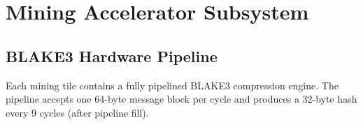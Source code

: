 \documentclass[11pt,a4paper]{article}
\begin{document}
\section{Mining Accelerator Subsystem}
\label{sec:mining}

\subsection{BLAKE3 Hardware Pipeline}

Each mining tile contains a fully pipelined BLAKE3 compression engine. The pipeline accepts one 64-byte message block per cycle and produces a 32-byte hash every 9 cycles (after pipeline fill).
\end{document}
